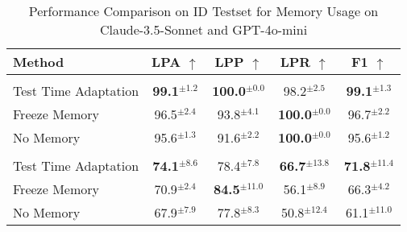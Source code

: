 \begin{table*}[ht]
    \centering
    {
    \setlength{\tabcolsep}{21.0pt}
    \begin{threeparttable}
    \begin{tabular}{@{}lcccc@{}}
        \toprule
        \textbf{Method} & \textbf{LPA} $\uparrow$ & \textbf{LPP} $\uparrow$ & \textbf{LPR} $\uparrow$ & \textbf{F1} $\uparrow$ \\
        \midrule
        \rowcolor[RGB]{230, 230, 230} \multicolumn{5}{c}{\textbf{Claude-3.5-Sonnet}} \\
        Test Time Adaptation     & \textbf{99.1}$^{\pm 1.2}$ & \textbf{100.0}$^{\pm 0.0}$  & 98.2$^{\pm 2.5}$  & \textbf{99.1}$^{\pm 1.3}$  \\
        Freeze Memory & 96.5$^{\pm 2.4}$ & 93.8$^{\pm 4.1}$   & \textbf{100.0}$^{\pm 0.0}$ & 96.7$^{\pm 2.2}$  \\
        No Memory     & 95.6$^{\pm 1.3}$ & 91.6$^{\pm 2.2}$   & \textbf{100.0}$^{\pm 0.0}$ & 95.6$^{\pm 1.2}$  \\
        \midrule
        \rowcolor[RGB]{230, 230, 230} \multicolumn{5}{c}{\textbf{GPT-4o-mini}} \\
        Test Time Adaptation     & \textbf{74.1}$^{\pm 8.6}$ & 78.4$^{\pm 7.8}$   & \textbf{66.7}$^{\pm 13.8}$ & \textbf{71.8}$^{\pm 11.4}$ \\
        Freeze Memory & 70.9$^{\pm 2.4}$ & \textbf{84.5}$^{\pm 11.0}$  & 56.1$^{\pm 8.9}$  & 66.3$^{\pm 4.2}$  \\
        No Memory     & 67.9$^{\pm 7.9}$ & 77.8$^{\pm 8.3}$   & 50.8$^{\pm 12.4}$ & 61.1$^{\pm 11.0}$ \\
        \bottomrule
    \end{tabular}
    \end{threeparttable}
    }
    \caption{Performance Comparison on ID Testset for Memory Usage on Claude-3.5-Sonnet and GPT-4o-mini}
    \label{app:ablation:ID}
\end{table*}


